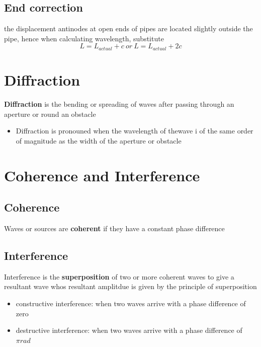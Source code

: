 \documentclass[a4paper, 10pt]{article}
\begin{document}
\subsection{End correction}
the displacement antinodes at open ends of pipes are located slightly outside the pipe, hence when calculating wavelength, substitute
\[
   L = L_{actual} + c \ or\ L = L_{actual} + 2c
\]

\section{Diffraction}
\begin{framed}
   \textbf{Diffraction} is the bending or spreading of waves after passing through an aperture or round an obstacle
\end{framed}	
\begin{itemize}
   \item Diffraction is pronouned when the wavelength of thewave i of the same order of magnitude as the width of the aperture or obstacle
\end{itemize}	

\section{Coherence and Interference}
\subsection{Coherence}
\begin{framed}
   Waves or sources are \textbf{coherent} if they have a constant phase difference
\end{framed}	
\subsection{Interference}
\begin{framed}
   Interference is the \textbf{superposition} of two or more coherent waves to give a resultant wave whos resultant amplitdue is given by the principle of superposition
\end{framed}	
\begin{itemize}
   \item constructive interference: when two waves arrive with a phase difference of zero
   \item destructive interference: when two waves arrive with a phase difference of $\pi rad$
\end{itemize}	
\end{document}
